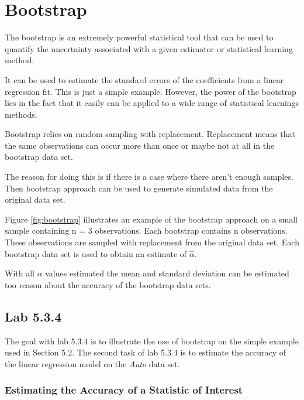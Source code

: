 \chapter{Bootstrap}
\label{chp:boots}

The bootstrap is an extremely powerful statistical tool that can be used to quantify the uncertainty associated with a given estimator or statistical learning method.

It can be used to estimate the standard errors of the coefficients from a linear regression fit. This is just a simple example. However, the power of the bootstrap lies in the fact that it easily can be applied to a wide range of statistical learnings methods.

Bootstrap relies on random sampling with replacement. Replacement means that the same observations can occur more than once or maybe not at all in the bootstrap data set.

The reason for doing this is if there is a case where there aren't enough samples. Then bootstrap approach can be used to generate simulated data from the original data set.


Figure \ref{fig:bootstrap} illustrates an example of the bootstrap approach on a small sample containing n = 3 observations. Each bootstrap contains n observations. These observations are sampled with replacement from the original data set. Each bootstrap data set is used to obtain an estimate of $\hat{\alpha}$.

With all $\alpha$ values estimated the mean and standard deviation can be estimated too reason about the accuracy of the bootstrap data sets.

\section{Lab 5.3.4}

The goal with lab 5.3.4 is to illustrate the use of bootstrap on the simple example used in Section 5.2\citep{ISLR}. The second task of lab 5.3.4 is to estimate the accuracy of the linear regression model on the \emph{Auto} data set.

\subsection{Estimating the Accuracy of a Statistic of Interest}

